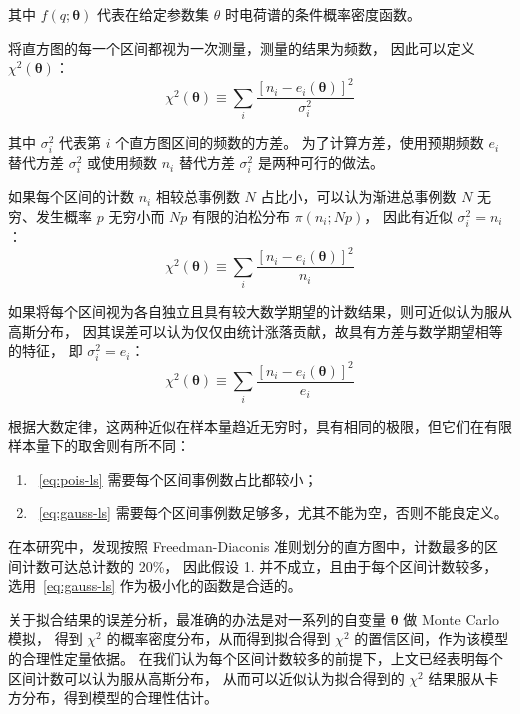 其中 $f(q;\boldsymbol{\theta})$ 代表在给定参数集 $\theta$ 时电荷谱的条件概率密度函数。

将直方图的每一个区间都视为一次测量，测量的结果为频数，
因此可以定义 $\chi^2(\boldsymbol{\theta})$：
\begin{equation}
    \chi^2(\boldsymbol{\theta})\equiv\sum_{i}\frac{\left[n_i-e_i(\boldsymbol{\theta})\right]^2}{\sigma_i^2}
\end{equation}

其中 $\sigma_i^2$ 代表第 $i$ 个直方图区间的频数的方差。
为了计算方差，使用预期频数 $e_i$ 替代方差 $\sigma_i^2$ 或使用频数 $n_i$ 替代方差 $\sigma_i^2$ 是两种可行的做法。

如果每个区间的计数 $n_i$ 相较总事例数 $N$ 占比小，可以认为渐进总事例数 $N$ 无穷、发生概率 $p$ 无穷小而 $Np$ 有限的泊松分布 $\pi(n_i;Np)$，
因此有近似 $\sigma^2_i=n_i$：
\begin{equation}
    \chi^2(\boldsymbol{\theta})\equiv\sum_{i}\frac{\left[n_i-e_i(\boldsymbol{\theta})\right]^2}{n_i}
    \label{eq:pois-ls}
\end{equation}

如果将每个区间视为各自独立且具有较大数学期望的计数结果，则可近似认为服从高斯分布，
因其误差可以认为仅仅由统计涨落贡献，故具有方差与数学期望相等的特征，
即 $\sigma^2_i=e_i$：
\begin{equation}
    \chi^2(\boldsymbol{\theta})\equiv\sum_{i}\frac{\left[n_i-e_i(\boldsymbol{\theta})\right]^2}{e_i}
    \label{eq:gauss-ls}
\end{equation}

根据大数定律，这两种近似在样本量趋近无穷时，具有相同的极限，但它们在有限样本量下的取舍则有所不同：
\begin{enumerate}
    \item~\eqref{eq:pois-ls} 需要每个区间事例数占比都较小；
    \item~\eqref{eq:gauss-ls} 需要每个区间事例数足够多，尤其不能为空，否则不能良定义。
\end{enumerate}

在本研究中，发现按照 Freedman-Diaconis 准则划分的直方图中，计数最多的区间计数可达总计数的 20\%，
因此假设 1. 并不成立，且由于每个区间计数较多，
选用~\eqref{eq:gauss-ls} 作为极小化的函数是合适的。

关于拟合结果的误差分析，最准确的办法是对一系列的自变量 $\boldsymbol{\theta}$ 做 Monte Carlo 模拟，
得到 $\chi^2$ 的概率密度分布，从而得到拟合得到 $\chi^2$ 的置信区间，作为该模型的合理性定量依据。
在我们认为每个区间计数较多的前提下，上文已经表明每个区间计数可以认为服从高斯分布，
从而可以近似认为拟合得到的 $\chi^2$ 结果服从卡方分布，得到模型的合理性估计。

